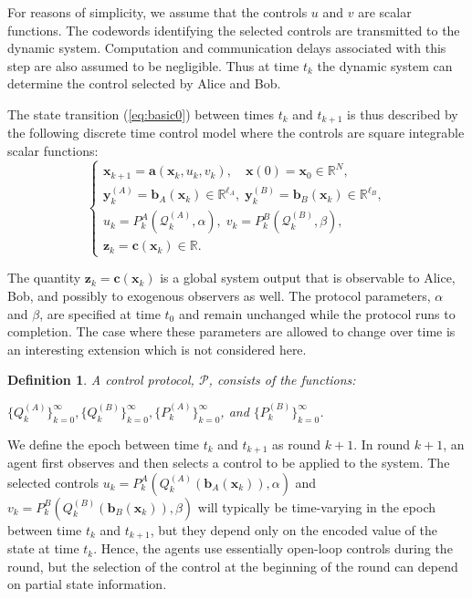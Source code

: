 \documentclass[12pt,onecolumn,draftcls]{IEEEtran}
\newcommand{\RR}{\mathbb{R}}
\newcommand{\ba}{\mathbf{a}}
\newcommand{\bb}{\mathbf{b}}
\newcommand{\bc}{\mathbf{c}}
\newcommand{\bx}{\mathbf{x}}
\newcommand{\by}{\mathbf{y}}
\newcommand{\bz}{\mathbf{z}}
\newcommand{\cP}{\mathcal{P}}
\newcommand{\cQ}{\mathcal{Q}}
\newtheorem{definition}{Definition}[section]
\begin{document}
For reasons of simplicity, we assume that the controls $u$ and $v$ are scalar functions.  The codewords identifying the selected controls are transmitted to the dynamic system.
Computation and communication delays associated with this step are also assumed to be negligible.
Thus at time $t_k$ the dynamic system can determine the control selected by Alice and Bob.

The state transition (\ref{eq:basic0}) between times $t_k$ and $t_{k+1}$ is thus described by the following discrete time control model
where the controls are square integrable scalar functions:
\begin{equation}
\left\{ \begin{array}{l}
\bx_{k+1} = \ba(\bx_{k},  u_{k}, v_{k}), \quad \bx(0) = \bx_0 \in \RR^N,\\
\by_k^{(A)}=\bb_A(\bx_k) \in \RR^{\ell_A}, \;
\by_k^{(B)}=\bb_B(\bx_k) \in \RR^{\ell_B},\\
u_k = P_k^{A}(\cQ_k^{(A)}, \alpha), \;
v_k = P_k^{B}(\cQ_k^{(B)}, \beta),\\
\bz_k=\bc(\bx_k) \in \RR.
\end{array}
\right.
\label{eq:basic1}
\end{equation}

The quantity $\bz_k=\bc(\bx_k)$ is a global system output that is observable to Alice, Bob, and possibly to
exogenous observers as well.  The protocol parameters, $\alpha$ and $\beta$, are specified
at time $t_0$ and remain unchanged while the protocol runs to completion.  The case where these parameters are
allowed to change over time is an interesting extension which is not considered here.

\begin{definition}
A control protocol, $\cP$, consists of the functions:

$\{Q_k^{(A)}\}_{k=0}^\infty, \{Q_k^{(B)}\}_{k=0}^\infty, \{P_k^{(A)}\}_{k=0}^\infty$, and $\{P_k^{(B)}\}_{k=0}^\infty$.
\end{definition}

We define the epoch between time $t_{k}$ and $t_{k+1}$ as round $k+1$.
In round $k+1$, an agent first observes and then selects a control to be applied to the
system.  The selected controls $u_k=P_k^{A}(Q_k^{(A)}(\bb_A(\bx_k)), \alpha)$ and 
$v_k = P_k^{B}(Q_k^{(B)}(\bb_B(\bx_k)), \beta)$ will typically be time-varying in the epoch between time $t_k$ and $t_{k+1}$, but they depend only on the encoded value of the state at time $t_k$.  Hence, the agents use essentially open-loop controls during the round, but the selection of
the control at the beginning of the round can depend on partial state information.  
\end{document}
